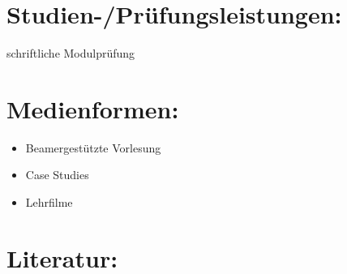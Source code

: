\section{Studien-/Prüfungsleistungen:}\label{studien-pruxfcfungsleistungen-15}

schriftliche Modulprüfung

\section{Medienformen:}\label{medienformen-15}

\begin{itemize}
\tightlist
\item
  Beamergestützte Vorlesung
\item
  Case Studies
\item
  Lehrfilme
\end{itemize}

\section{Literatur:}\label{literatur-15}

